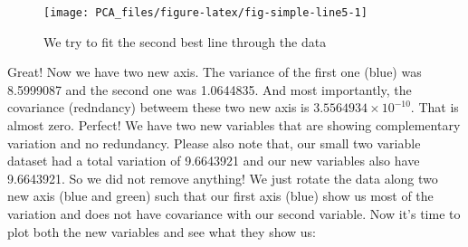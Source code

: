\documentclass[
]{book}
\theoremstyle{definition}
\theoremstyle{definition}
\theoremstyle{definition}
\theoremstyle{remark}
\begin{document}
\begin{figure}

{\centering \texttt{[image: PCA\_files/figure-latex/fig-simple-line5-1]} 

}

\caption{We try to fit the second best line through the data}\label{fig:fig-simple-line5}
\end{figure}

Great! Now we have two new axis. The variance of the first one (blue) was 8.5999087 and the second one was 1.0644835. And most importantly, the covariance (redndancy) betweem these two new axis is \ensuremath{3.5564934\times 10^{-10}}. That is almost zero. Perfect! We have two new variables that are showing complementary variation and no redundancy. Please also note that, our small two variable dataset had a total variation of 9.6643921 and our new variables also have 9.6643921. So we did not remove anything! We just rotate the data along two new axis (blue and green) such that our first axis (blue) show us most of the variation and does not have covariance with our second variable. Now it's time to plot both the new variables and see what they show us:
\end{document}
